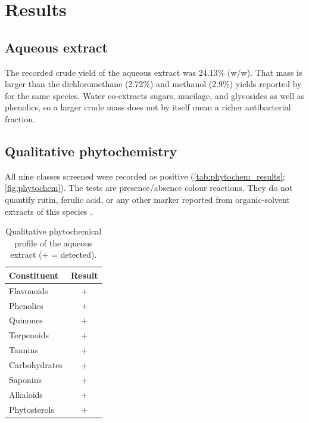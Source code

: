 
\chapter{Results}
\label{ch:results}

\section{Aqueous extract}
\label{sec:results_yield}

The recorded crude yield of the aqueous extract was 24.13\% (w/w). That mass is larger than the dichloromethane (2.72\%) and methanol (2.9\%) yields reported by \citet{drakhshaan2026} for the same species. Water co-extracts sugars, mucilage, and glycosides as well as phenolics, so a larger crude mass does not by itself mean a richer antibacterial fraction.

\section{Qualitative phytochemistry}
\label{sec:results_phytochem}

All nine classes screened were recorded as positive (\autoref{tab:phytochem_results}; \autoref{fig:phytochem}). The tests are presence/absence colour reactions. They do not quantify rutin, ferulic acid, or any other marker reported from organic-solvent extracts of this species \citep{drakhshaan2026}.

\begin{table}[htbp]
  \centering
  \caption{Qualitative phytochemical profile of the aqueous extract ($+$ = detected).}
  \label{tab:phytochem_results}
  \begin{tabular}{lc}
    \toprule
    \textbf{Constituent} & \textbf{Result} \\
    \midrule
    Flavonoids & $+$ \\
    Phenolics & $+$ \\
    Quinones & $+$ \\
    Terpenoids & $+$ \\
    Tannins & $+$ \\
    Carbohydrates & $+$ \\
    Saponins & $+$ \\
    Alkaloids & $+$ \\
    Phytosterols & $+$ \\
    \bottomrule
  \end{tabular}
\end{table}

